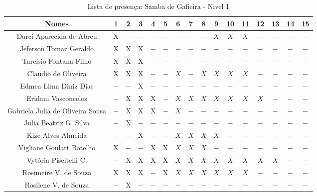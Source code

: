 \documentclass[a4paper,12pt]{article}
\begin{document}
\begin{landscape}

\begin{table}[!htbp]
\vspace*{-2cm}\centering
\caption{Lista de presença: Samba de Gafieira - Nivel 1}
\begin{tabular}{|*{16}{c|}}
\hline%
 Nomes                                     & 1  & 2  & 3  & 4   & 5   & 6   & 7   & 8   & 9   & 10  & 11  & 12  & 13  & 14  & 15  \\ \hline 
 \LARGE Darci Aparecida de Abreu           &X   &$-$ &$-$ &$-$  &$-$  &$-$  &$-$  &$-$  &$X$  &$X$  &$X$  &$-$  &$-$  &$-$  &$-$  \\ \hline
 \LARGE Jeferson Tomaz Geraldo             &X   &X   &X   &$-$  &$-$  &$-$  &$-$  &$-$  &$-$  &$-$  &$-$  &$-$  &$-$  &$-$  &$-$  \\ \hline
 \LARGE Tarcísio Fontana Filho             &X   &X   &X   &$-$  &$-$  &$-$  &$-$  &$-$  &$-$  &$-$  &$-$  &$-$  &$-$  &$-$  &$-$  \\ \hline
 \LARGE Claudio de Oliveira                &X   &X   &X   &$-$  &$-$  &$X$  &$-$  &$X$  &$X$  &$X$  &$X$  &$-$  &$-$  &$-$  &$-$  \\ \hline
 \LARGE Edmea Lima Diniz Dias              &$-$ &$-$ &X   &$-$  &$-$  &$-$  &$-$  &$-$  &$-$  &$-$  &$-$  &$-$  &$-$  &$-$  &$-$  \\ \hline
 \LARGE Eridani Vasconcelos                &$-$ &X   &X   &X    &$-$  &$X$  &$X$  &$X$  &$X$  &$X$  &$X$  &$X$  &$-$  &$-$  &$-$  \\ \hline
 \LARGE Gabriela Julia de Oliveira Sousa   &$-$ &X   &X   &X    &$-$  &$X$  &$-$  &$-$  &$-$  &$-$  &$-$  &$-$  &$-$  &$-$  &$-$  \\ \hline
 \LARGE Julia Beatriz G. Silva             &$-$ &X   &$-$ &$-$  &$-$  &$-$  &$-$  &$-$  &$-$  &$-$  &$-$  &$-$  &$-$  &$-$  &$-$  \\ \hline
 \LARGE Kize Alves Almeida                 &$-$ &$-$ &X   &$-$  &$-$  &$X$  &$X$  &$X$  &$X$  &$-$  &$-$  &$-$  &$-$  &$-$  &$-$  \\ \hline
 \LARGE Vigliane Goulart Botelho           &X   &$-$ &$-$ &X    &X    &$X$  &$X$  &$X$  &$-$  &$-$  &$-$  &$-$  &$-$  &$-$  &$-$  \\ \hline
 \LARGE Vytória Piscitelli C.              &$-$ &X   &X   &X    &X    &$X$  &$X$  &$X$  &$X$  &$X$  &$X$  &$X$  &$X$  &$-$  &$-$  \\ \hline
 \LARGE Rosimeire V. de Souza              &X   &X   &X   &$-$  &X    &$X$  &$X$  &$X$  &$X$  &$X$  &$X$  &$-$  &$-$  &$-$  &$-$  \\ \hline
 \LARGE Rosilene V. de Souza               &$-$ &X   &$-$ &$-$  &$-$  &$-$  &$-$  &$-$  &$-$  &$-$  &$-$  &$-$  &$-$  &$-$  &$-$  \\ \hline
 

\end{tabular}
\end{table}
\end{landscape}
\end{document}
